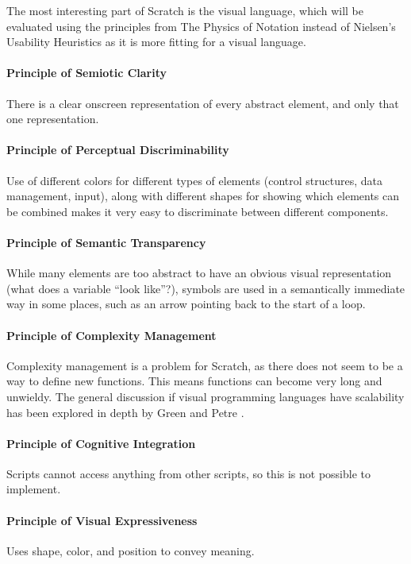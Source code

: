 The most interesting part of Scratch is the visual language, which will be evaluated using the principles from The Physics of Notation  instead of Nielsen's Usability Heuristics as it is more fitting
for a visual language.

\paragraph{Principle of Semiotic Clarity}
There is a clear onscreen representation of every abstract element, and only that one representation.

\paragraph{Principle of Perceptual Discriminability}
Use of different colors for different types of elements (control structures, data management, input), along with different shapes for showing which elements can be combined makes it very easy to discriminate between different components.

\paragraph{Principle of Semantic Transparency}
While many elements are too abstract to have an obvious visual representation (what does a variable ``look like''?), symbols are used in a semantically immediate way in some places, such as an arrow pointing back to the start of a loop. 

\paragraph{Principle of Complexity Management}
Complexity management is a problem for Scratch, as there does not seem to be a way to define new functions. This means functions can become very long and unwieldy. The general discussion if visual programming languages have scalability has been explored in depth by Green and Petre \cite{green1992visual}.

\paragraph{Principle of Cognitive Integration}
Scripts cannot access anything from other scripts, so this is not possible to implement. 

\paragraph{Principle of Visual Expressiveness}
Uses shape, color, and position to convey meaning. 


